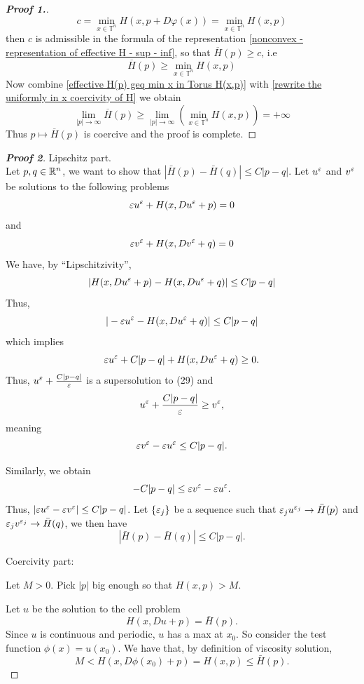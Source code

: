 \documentclass[12pt, oneside]{amsart}  	%
\begin{document}
\begin{proof}[\textbf{Proof 1.}]
\begin{equation*}
c = \min_{x\in \mathbb{T}^n} H(x,p+D\varphi(x)) = \min_{x\in \mathbb{T}^n} H(x,p)
\end{equation*}
then $c$ is admissible in the formula of the representation \eqref{nonconvex - representation of effective H - sup - inf}, so that $\overline{H}(p)\geq c$, i.e
\begin{equation}\label{effective H(p) geq min x in Torus H(x,p)}
\overline{H}(p) \geq \min_{x\in \mathbb{T}^n} H(x,p) 
\end{equation}
Now combine \eqref{effective H(p) geq min x in Torus H(x,p)} with \eqref{rewrite the uniformly in x coercivity of H} we obtain 
\begin{equation*}
\lim_{|p|\longrightarrow \infty} \overline{H}(p) \geq \lim_{|p|\longrightarrow \infty} \left( \min_{x\in \mathbb{T}^n} H(x,p) \right) = +\infty
\end{equation*}
Thus $p\longmapsto \overline{H}(p)$ is coercive and the proof is complete.
\end{proof}

\begin{proof}[\textbf{Proof 2}] Lipschitz part.\\
Let $p, q\in \mathbb{R}^n$, we want to show that $|\bar{H}(p)-\bar{H}(q)|\le C|p-q|$. Let $u^\varepsilon$ and $v^\varepsilon$ be solutions to the following problems
\begin{equation}
		\varepsilon u^\varepsilon + H(x, Du^\varepsilon + p)=0
\end{equation}
	and
\begin{equation}
		\varepsilon v^\varepsilon + H(x, Dv^\varepsilon + q)=0
\end{equation}
We have, by ``Lipschitzivity'',
	$$|H(x, Du^\varepsilon + p) - H(x, Du^\varepsilon + q)| \le C|p-q|$$
Thus,
	$$|-\varepsilon u^\varepsilon - H(x, Du^\varepsilon + q)| \le C|p-q|$$
which implies
	\begin{equation}
	 \varepsilon u^\varepsilon+C|p-q| + H(x, Du^\varepsilon +q) \ge 0. \label{inequality_1}
	\end{equation}
	Thus, $u^\varepsilon + \frac{C|p-q|}{\varepsilon}$ is a supersolution to (29) and 
	$$u^\varepsilon + \frac{C|p-q|}{\varepsilon}\ge v^\varepsilon,$$
	meaning $$\varepsilon v^\varepsilon-\varepsilon u^\varepsilon \le C|p-q|.$$ 
	
	Similarly, we obtain
	$$-C|p-q| \le \varepsilon v^\varepsilon-\varepsilon u^\varepsilon .$$
	Thus, $|\varepsilon u^\varepsilon - \varepsilon v^\varepsilon| \le C|p-q|$. Let $\{ \varepsilon_j\}$ be a sequence such that $\varepsilon_j u^{\varepsilon_j} \to \bar{H}(p)$ and $\varepsilon_j v^{\varepsilon_j} \to \bar{H}(q)$, we then have
	$$|\bar{H}(p)- \bar{H}(q)| \le C|p-q|.$$
		
	Coercivity part: 

	Let $M>0$. Pick $|p|$ big enough so that $H(x,p)>M$.
		
	Let $u$ be the solution to the cell problem
	$$H(x, Du+p) = \bar{H}(p).$$
	Since $u$ is continuous and periodic, $u$ has a max at $x_0$. So consider the test function $\phi(x)={u(x_0)}$. We have that, by definition of viscosity solution, 
	$$M< H(x,D\phi(x_0)+p)=H(x,p) \le \bar{H}(p).$$
\end{proof}
\end{document}
